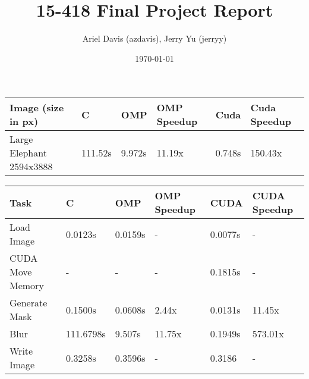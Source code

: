 \documentclass[12pt]{article}
\author{Ariel Davis (azdavis), Jerry Yu (jerryy)}
\date{\today}
\title{15-418 Final Project Report}
\begin{document}
\maketitle

\begin{tabular}{l|l|l|l|l|l}
    Image (size in px) & C & OMP & OMP Speedup & Cuda & Cuda Speedup \\
    \hline
    Large Elephant 2594x3888 & 111.52s & 9.972s & 11.19x & 0.748s & 150.43x \\
\end{tabular}

\begin{tabular}{l|l|l|l|l|l}
    Task & C & OMP & OMP Speedup & CUDA & CUDA Speedup\\
    \hline
    Load Image & 0.0123s & 0.0159s & - & 0.0077s & -\\
    CUDA Move Memory & - & - & - & 0.1815s & -\\
    Generate Mask & 0.1500s & 0.0608s & 2.44x & 0.0131s & 11.45x\\
    Blur & 111.6798s & 9.507s & 11.75x & 0.1949s & 573.01x \\
    Write Image & 0.3258s & 0.3596s & - & 0.3186 & -
\end{tabular}
\end{document}
